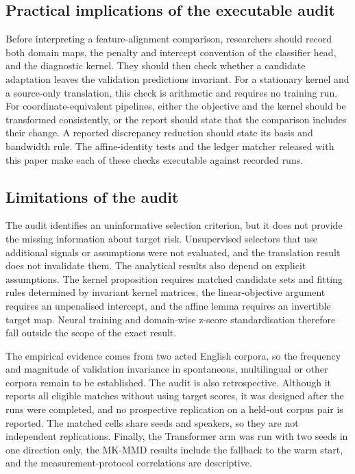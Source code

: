 \subsection{Practical implications of the executable audit}
\label{sec:discussion-testing}

Before interpreting a feature-alignment comparison, researchers should record
both domain maps, the penalty and intercept convention of the classifier head,
and the diagnostic kernel. They should then check whether a candidate
adaptation leaves the validation predictions invariant. For a stationary kernel
and a source-only translation, this check is arithmetic and requires no
training run. For coordinate-equivalent pipelines, either the objective and the
kernel should be transformed consistently, or the report should state that the
comparison includes their change. A reported discrepancy reduction should state
its basis and bandwidth rule. The affine-identity tests and the ledger matcher
released with this paper make each of these checks executable against recorded
runs.

\subsection{Limitations of the audit}
\label{sec:limitations}

The audit identifies an uninformative selection criterion, but it does not
provide the missing information about target risk. Unsupervised selectors that
use additional signals or assumptions \cite{you2019selection,hu2024selection}
were not evaluated, and the translation result does not invalidate them. The
analytical results also depend on explicit assumptions. The kernel proposition
requires matched candidate sets and fitting rules determined by invariant
kernel matrices, the linear-objective argument requires an unpenalised
intercept, and the affine lemma requires an invertible target map. Neural
training and domain-wise z-score standardisation therefore fall outside the
scope of the exact result.

The empirical evidence comes from two acted English corpora, so the frequency
and magnitude of validation invariance in spontaneous, multilingual or other
corpora remain to be established. The audit is also retrospective. Although it
reports all eligible matches without using target scores, it was designed after
the runs were completed, and no prospective replication on a held-out corpus
pair is reported. The matched cells share seeds and speakers, so they are not
independent replications. Finally, the Transformer arm was run with two seeds
in one direction only, the MK-MMD results include the fallback to the warm
start, and the measurement-protocol correlations are descriptive.
